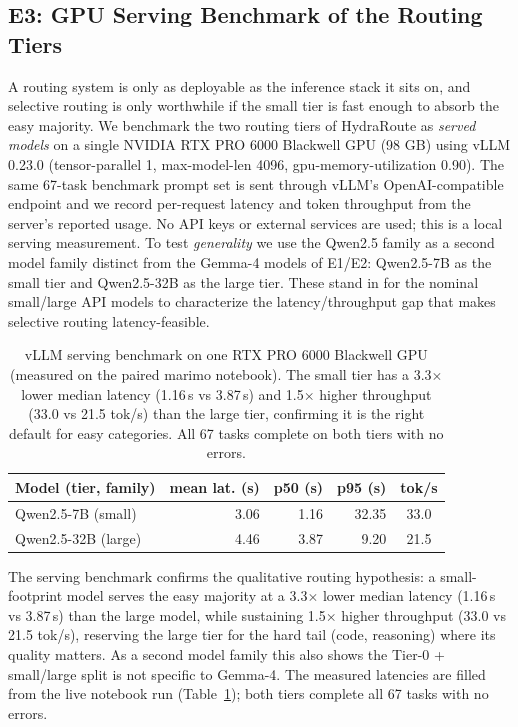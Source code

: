 \documentclass[11pt]{article}
\newcommand{\system}{HydraRoute\xspace}
\begin{document}
\subsection{E3: GPU Serving Benchmark of the Routing Tiers}
\label{sec:serve}

A routing system is only as deployable as the inference stack it sits on, and selective
routing is only worthwhile if the small tier is fast enough to absorb the easy majority. We
benchmark the two routing tiers of \system as \emph{served models} on a single NVIDIA RTX
PRO 6000 Blackwell GPU (98 GB) using vLLM 0.23.0 (tensor-parallel 1, max-model-len 4096,
gpu-memory-utilization 0.90). The same 67-task benchmark prompt set is sent through vLLM's
OpenAI-compatible endpoint and we record per-request latency and token throughput from the
server's reported usage. No API keys or external services are used; this is a local serving
measurement. To test \emph{generality} we use the Qwen2.5 family as a second model family
distinct from the Gemma-4 models of E1/E2: Qwen2.5-7B as the small tier and Qwen2.5-32B as
the large tier. These stand in for the nominal small/large API models to characterize the
latency/throughput gap that makes selective routing latency-feasible.

\begin{table}[t]
\centering
\small
\begin{tabular}{@{}lrrrc@{}}
\toprule
Model (tier, family) & mean lat. (s) & p50 (s) & p95 (s) & tok/s \\
\midrule
Qwen2.5-7B (small) & 3.06 & 1.16 & 32.35 & 33.0 \\
Qwen2.5-32B (large) & 4.46 & 3.87 & 9.20 & 21.5 \\
\bottomrule
\end{tabular}
\caption{vLLM serving benchmark on one RTX PRO 6000 Blackwell GPU (measured on the paired
marimo notebook). The small tier has a 3.3$\times$ lower median latency (1.16\,s vs 3.87\,s)
and 1.5$\times$ higher throughput (33.0 vs 21.5 tok/s) than the large tier, confirming it is
the right default for easy categories. All 67 tasks complete on both tiers with no errors.}
\label{tab:e3}
\end{table}

The serving benchmark confirms the qualitative routing hypothesis: a small-footprint model
serves the easy majority at a 3.3$\times$ lower median latency (1.16\,s vs 3.87\,s) than the
large model, while sustaining 1.5$\times$ higher throughput (33.0 vs 21.5 tok/s), reserving the
large tier for the hard tail (code, reasoning) where its quality matters. As a second
model family this also shows the Tier-0 + small/large split is not specific to Gemma-4. The
measured latencies are filled from the live notebook run (Table~\ref{tab:e3}); both tiers
complete all 67 tasks with no errors.
\end{document}
